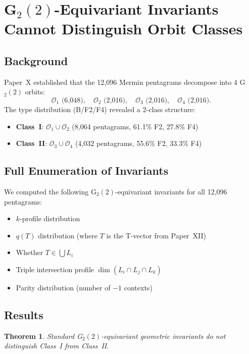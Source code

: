 \documentclass[11pt,a4paper]{article}
\newtheorem{theorem}{Theorem}[section]
\theoremstyle{remark}
\begin{document}
\section{\texorpdfstring{G$_2(2)$-Equivariant Invariants Cannot Distinguish Orbit Classes}{G2(2)-Equivariant Invariants Cannot Distinguish Orbit Classes}}\label{sec:class2}

\subsection{Background}

Paper~X \cite{PaperX} established that the 12{,}096 Mermin pentagrams decompose into 4 G$_2(2)$ orbits:
\[
  \mathcal{O}_1 \text{ (6{,}048)}, \quad \mathcal{O}_2 \text{ (2{,}016)}, \quad \mathcal{O}_3 \text{ (2{,}016)}, \quad \mathcal{O}_4 \text{ (2{,}016)}.
\]
The type distribution (B/F2/F4) revealed a 2-class structure:
\begin{itemize}
  \item \textbf{Class~I}: $\mathcal{O}_1 \cup \mathcal{O}_2$ (8{,}064 pentagrams, 61.1\% F2, 27.8\% F4)
  \item \textbf{Class~II}: $\mathcal{O}_3 \cup \mathcal{O}_4$ (4{,}032 pentagrams, 55.6\% F2, 33.3\% F4)
\end{itemize}

\subsection{Full Enumeration of Invariants}

We computed the following G$_2(2)$-equivariant invariants for all 12{,}096 pentagrams:
\begin{itemize}
  \item $k$-profile distribution
  \item $q(T)$ distribution (where $T$ is the T-vector from Paper~XII)
  \item Whether $T \in \bigcup L_i$
  \item Triple intersection profile $\dim(L_i \cap L_j \cap L_k)$
  \item Parity distribution (number of $-1$ contexts)
\end{itemize}

\subsection{Results}

\begin{theorem}\label{thm:invariants-fail}
Standard G$_2(2)$-equivariant geometric invariants do not distinguish Class~I from Class~II.
\end{theorem}
\end{document}
